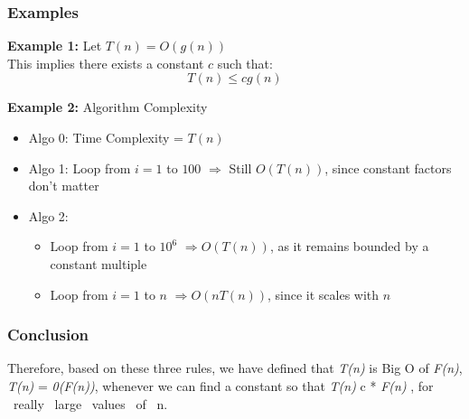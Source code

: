 \begin{frame}
    \frametitle{Examples}
    \vspace{0.3cm}
    \textbf{Example 1:} Let $T(n) = O(g(n))$ \\
    This implies there exists a constant $c$ such that:
    \[ T(n) \leq c g(n) \]
    
    \textbf{Example 2:} Algorithm Complexity
    \begin{itemize}
        \item Algo 0: Time Complexity = $T(n)$
        \item Algo 1: Loop from $i = 1$ to $100$ \newline
        $\Rightarrow$ Still $O(T(n))$, since constant factors don't matter
        \item Algo 2:
        \begin{itemize}
            \item Loop from $i = 1$ to $10^6$ \newline
            $\Rightarrow O(T(n))$, as it remains bounded by a constant multiple
            \item Loop from $i = 1$ to $n$ \newline
            $\Rightarrow O(n T(n))$, since it scales with $n$
        \end{itemize}
    \end{itemize}
\end{frame}

\begin{frame}
    \frametitle{Conclusion}
    \begin{block}{\textcolor{black}{}}
        \item Therefore, based on these three rules, we have defined that \textit{T(n)} is Big O of \textit{F(n)}, \textit{T(n)} = \textit{0(F(n))}, whenever we can find a constant so that \textit{T(n)} \leq c * \textit{F(n)} , for \ really \ large \ values \ of \ n.
    \end{block}

    
\end{frame}

